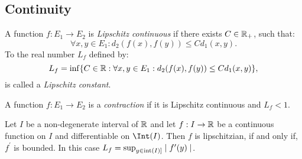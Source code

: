 \subsection{Continuity}


\begin{definition}
	A function $f: E_1 \to E_2$ is \emph{Lipschitz continuous} if there exists $C \in \mathbb{R}_+$, such that:
	\begin{equation*}
		\forall x,y \in E_1 : d_2(f(x), f(y)) \leq C d_1(x,y).
	\end{equation*}		
	To the real number $L_f$ defined by:
	\begin{equation*}
		L_f = \inf \{ C \in \mathbb{R} : \forall x,y \in E_1 : d_2(f(x),f(y)) \leq C d_1(x,y) \},
	\end{equation*}
		is called a \emph{Lipschitz constant}.
\end{definition}



\begin{definition}
	A function $f : E_1 \to E_2$ is a \emph{contraction} if it is Lipschitz continuous and $L_f < 1$.
\end{definition}

\begin{theorem}
	Let $I$ be a non-degenerate interval of $\mathbb{R}$ and let $f : I \to \mathbb{R}$ be a continuous function on $I$ and differentiable on $\Int(I)$. Then $f$ is lipschitzian, if and only if, $f^\prime$ is bounded. In this case $L_f = \sup _{y \in \operatorname{int}(I)]} \mid f^\prime (y) \mid$.
\end{theorem}

